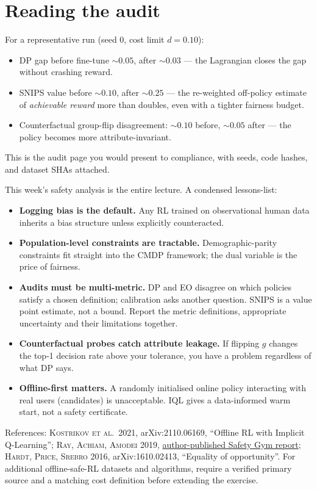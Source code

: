 \documentclass[11pt,oneside]{scrbook}
\begin{document}
\section{Reading the audit}

For a representative run (seed $0$, cost limit $d = 0.10$):
\begin{itemize}[leftmargin=*]
  \item DP gap before fine-tune $\sim 0.05$, after $\sim 0.03$ --- the
        Lagrangian closes the gap without crashing reward.
  \item SNIPS value before $\sim 0.10$, after $\sim 0.25$ --- the
        re-weighted off-policy estimate of \emph{achievable reward} more
        than doubles, even with a tighter fairness budget.
  \item Counterfactual group-flip disagreement: $\sim 0.10$ before,
        $\sim 0.05$ after --- the policy becomes more attribute-invariant.
\end{itemize}
This is the audit page you would present to compliance, with seeds, code
hashes, and dataset SHAs attached.

\begin{safetyangle}
This week's safety analysis is the entire lecture. A condensed lessons-list:
\begin{itemize}[leftmargin=*]
  \item \textbf{Logging bias is the default.} Any RL trained on observational
        human data inherits a bias structure unless explicitly counteracted.
  \item \textbf{Population-level constraints are tractable.} Demographic-parity
        constraints fit straight into the CMDP framework; the dual variable
        is the price of fairness.
  \item \textbf{Audits must be multi-metric.} DP and EO disagree on which
        policies satisfy a chosen definition; calibration asks another question. SNIPS is a value point estimate, not a bound. Report the metric definitions, appropriate uncertainty and their limitations together.
  \item \textbf{Counterfactual probes catch attribute leakage.} If flipping
        $g$ changes the top-1 decision rate above your tolerance, you have
        a problem regardless of what DP says.
  \item \textbf{Offline-first matters.} A randomly initialised online
        policy interacting with real users (candidates) is unacceptable.
        IQL gives a data-informed warm start, not a safety certificate.
\end{itemize}
References: \textsc{Kostrikov et al.\ 2021}, arXiv:2110.06169, ``Offline RL
with Implicit Q-Learning''; \textsc{Ray, Achiam, Amodei 2019}, \href{https://cdn.openai.com/safexp-short.pdf}{author-published Safety Gym report};
\textsc{Hardt, Price, Srebro 2016}, arXiv:1610.02413, ``Equality of opportunity''.
For additional offline-safe-RL datasets and algorithms, require a verified primary source and a matching cost definition before extending the exercise.
\end{safetyangle}
\end{document}
